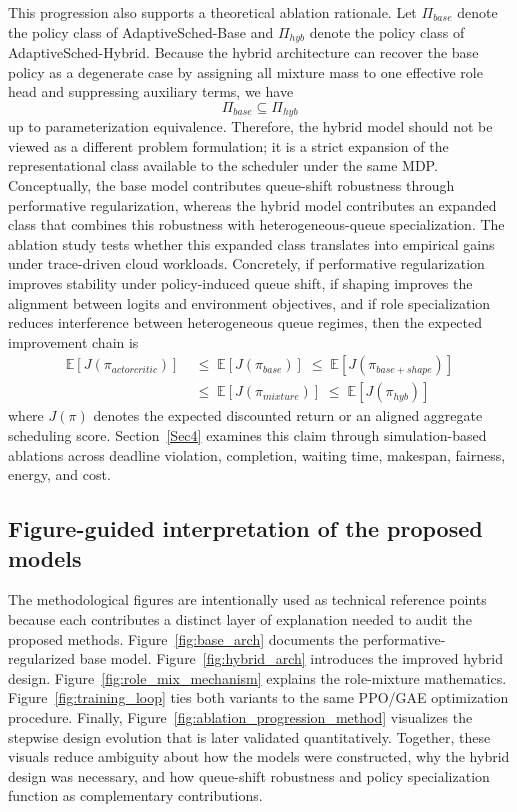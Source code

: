 \documentclass[journal]{IEEEtran}
\begin{document}
This progression also supports a theoretical ablation rationale. Let $\Pi_{base}$ denote the policy class of AdaptiveSched-Base and $\Pi_{hyb}$ denote the policy class of AdaptiveSched-Hybrid. Because the hybrid architecture can recover the base policy as a degenerate case by assigning all mixture mass to one effective role head and suppressing auxiliary terms, we have
\begin{equation}
\Pi_{base} \subseteq \Pi_{hyb}
\end{equation}
up to parameterization equivalence. Therefore, the hybrid model should not be viewed as a different problem formulation; it is a strict expansion of the representational class available to the scheduler under the same MDP. Conceptually, the base model contributes queue-shift robustness through performative regularization, whereas the hybrid model contributes an expanded class that combines this robustness with heterogeneous-queue specialization. The ablation study tests whether this expanded class translates into empirical gains under trace-driven cloud workloads. Concretely, if performative regularization improves stability under policy-induced queue shift, if shaping improves the alignment between logits and environment objectives, and if role specialization reduces interference between heterogeneous queue regimes, then the expected improvement chain is
\begin{equation}
\begin{aligned}
\mathbb{E}[J(\pi_{actorcritic})]
&\;\leq\;
\mathbb{E}[J(\pi_{base})]
\;\leq\;
\mathbb{E}[J(\pi_{base+shape})] \\
&\;\leq\;
\mathbb{E}[J(\pi_{mixture})]
\;\leq\;
\mathbb{E}[J(\pi_{hyb})]
\end{aligned}
\end{equation}
where $J(\pi)$ denotes the expected discounted return or an aligned aggregate scheduling score. Section~\ref{Sec4} examines this claim through simulation-based ablations across deadline violation, completion, waiting time, makespan, fairness, energy, and cost.

\subsection{Figure-guided interpretation of the proposed models}
The methodological figures are intentionally used as technical reference points because each contributes a distinct layer of explanation needed to audit the proposed methods. Figure~\ref{fig:base_arch} documents the performative-regularized base model. Figure~\ref{fig:hybrid_arch} introduces the improved hybrid design. Figure~\ref{fig:role_mix_mechanism} explains the role-mixture mathematics. Figure~\ref{fig:training_loop} ties both variants to the same PPO/GAE optimization procedure. Finally, Figure~\ref{fig:ablation_progression_method} visualizes the stepwise design evolution that is later validated quantitatively. Together, these visuals reduce ambiguity about how the models were constructed, why the hybrid design was necessary, and how queue-shift robustness and policy specialization function as complementary contributions.
\end{document}
